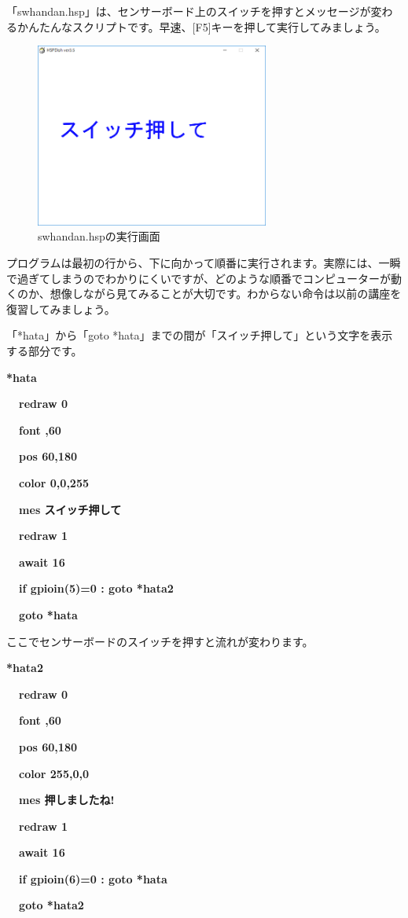 「swhandan.hsp」は、センサーボード上のスイッチを押すとメッセージが変わるかんたんなスクリプトです。早速、[F5]キーを押して実行してみましょう。


\begin{figure}[H]
    \begin{center}
      \includegraphics[width=7.673cm,height=6.05cm]{text04-img/text04-img003.png}
      \caption{swhandan.hspの実行画面}
    \end{center}
    \label{fig:read_from_directory}
\end{figure}


プログラムは最初の行から、下に向かって順番に実行されます。実際には、一瞬で過ぎてしまうのでわかりにくいですが、どのような順番でコンピューターが動くのか、想像しながら見てみることが大切です。わからない命令は以前の講座を復習してみましょう。

「*hata」から「goto *hata」までの間が「スイッチ押して」という文字を表示する部分です。





{\bfseries
*hata}

{\bfseries
\ \ redraw 0}

{\bfseries
\ \ font {\textquotedbl}{\textquotedbl},60}

{\bfseries
\ \ pos 60,180}

{\bfseries
\ \ color 0,0,255}

{\bfseries
\ \ mes {\textquotedbl}スイッチ押して{\textquotedbl}}

{\bfseries
\ \ redraw 1}

{\bfseries
\ \ await 16}

{\bfseries
\ \ if gpioin(5)=0 : goto *hata2}

{\bfseries
\ \ goto *hata}


ここでセンサーボードのスイッチを押すと流れが変わります。

{\bfseries
*hata2}

{\bfseries
\ \ redraw 0}

{\bfseries
\ \ font {\textquotedbl}{\textquotedbl},60}

{\bfseries
\ \ pos 60,180}

{\bfseries
\ \ color 255,0,0}

{\bfseries
\ \ mes {\textquotedbl}押しましたね!{\textquotedbl}}

{\bfseries
\ \ redraw 1}

{\bfseries
\ \ await 16}

{\bfseries
\ \ if gpioin(6)=0 : goto *hata}

{\bfseries
\ \ goto *hata2}


